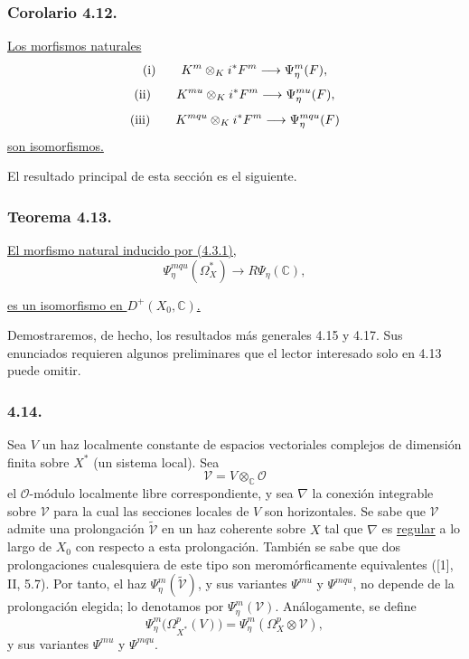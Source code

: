 \subsubsection*{Corolario 4.12.}
\underline{Los morfismos naturales}
\[
\textup{(i)}\qquad
K^m\otimes_K i^*F^m\longrightarrow\Psi_\eta^m(F),
\]
\[
\textup{(ii)}\qquad
K^{mu}\otimes_K i^*F^m\longrightarrow\Psi_\eta^{mu}(F),
\]
\[
\textup{(iii)}\qquad
K^{mqu}\otimes_K i^*F^m\longrightarrow\Psi_\eta^{mqu}(F)
\]
\underline{son isomorfismos.}

El resultado principal de esta sección es el siguiente.

\subsubsection*{Teorema 4.13.}
\underline{El morfismo natural inducido por (4.3.1),}
\begin{equation}\tag{4.13.1}
\Psi_\eta^{mqu}(\Omega_X^*)
\longrightarrow R\Psi_\eta(\mathbb C),
\end{equation}

\pageoriginale

\underline{es un isomorfismo en $D^+(X_0,\mathbb C)$.}

Demostraremos, de hecho, los resultados más generales 4.15 y 4.17.
Sus enunciados requieren algunos preliminares que el lector interesado
solo en 4.13 puede omitir.

\subsubsection*{4.14.}
Sea $V$ un haz localmente constante de espacios vectoriales complejos
de dimensión finita sobre $X^*$ (un sistema local). Sea
\[
\mathcal V=V\otimes_{\mathbb C}\mathcal O
\]
el $\mathcal O$-módulo localmente libre correspondiente, y sea $\nabla$
la conexión integrable sobre $\mathcal V$ para la cual las secciones
locales de $V$ son horizontales. Se sabe que $\mathcal V$ admite una
prolongación $\widetilde{\mathcal V}$ en un haz coherente sobre $X$ tal
que $\nabla$ es \underline{regular} a lo largo de $X_0$ con respecto a
esta prolongación. También se sabe que dos prolongaciones cualesquiera
de este tipo son meromórficamente equivalentes ([1], II, 5.7). Por
tanto, el haz $\Psi_\eta^m(\widetilde{\mathcal V})$, y sus variantes
$\Psi^{mu}$ y $\Psi^{mqu}$, no depende de la prolongación elegida; lo
denotamos por $\Psi_\eta^m(\mathcal V)$. Análogamente, se define
\[
\Psi_\eta^m\bigl(\Omega_{X^*}^p(V)\bigr)
=\Psi_\eta^m(\Omega_X^p\otimes\mathcal V),
\]
y sus variantes $\Psi^{mu}$ y $\Psi^{mqu}$.


